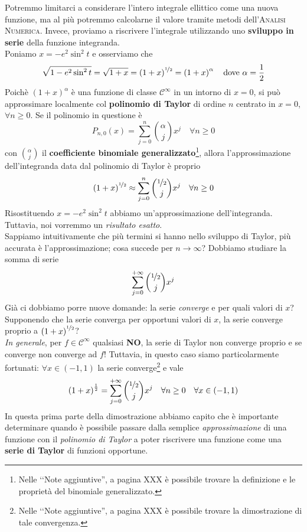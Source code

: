 Potremmo limitarci a considerare l'intero integrale ellittico come una nuova funzione, ma al più potremmo calcolarne il valore tramite metodi dell'\textsc{Analisi Numerica}. Invece, proviamo a riscrivere l'integrale utilizzando uno \textbf{sviluppo in serie} della funzione integranda.\\
Poniamo $x=-e^2\sin^2t$ e osserviamo che
\begin{equation*}
	\sqrt{1-e^2\sin^2 t}=\sqrt{1+x}=\left(1+x\right)^{\nicefrac{1}{2}}=\left(1+x\right)^\alpha\quad\text{dove }\alpha=\frac{1}{2}
\end{equation*}
Poichè $\left(1+x\right)^\alpha$ è una funzione di classe $\mathcal{C}^\infty$ in un intorno di $x=0$, si può approssimare localmente col \textbf{polinomio di Taylor} di ordine $n$ centrato in $x=0$, $\forall n\geq 0$. Se il polinomio in questione è
\begin{equation*}
	P_{n,0}\left(x\right)=\sum_{j=0}^{n}\binom{\alpha}{j}x^j\quad\forall n\geq 0
\end{equation*}
con $\displaystyle\binom{\alpha}{j}$ il \textbf{coefficiente binomiale generalizzato}\footnote{Nelle ‘‘Note aggiuntive'', a pagina XXX è possibile trovare la definizione e le proprietà del binomiale generalizzato.}, allora l'approssimazione dell'integranda data dal polinomio di Taylor è proprio
\begin{equation*}
	\left(1+x\right)^{\nicefrac{1}{2}}\approx\sum_{j=0}^{n}\binom{\nicefrac{1}{2}}{j}x^j\quad\forall n\geq 0
\end{equation*}
Risostituendo $x=-e^2\sin^2t$ abbiamo un'approssimazione dell'integranda. Tuttavia, noi vorremmo un \textit{risultato esatto}.\\
Sappiamo intuitivamente che più termini si hanno nello sviluppo di Taylor, più accurata è l'approssimazione; cosa succede per $n\to\infty$? Dobbiamo studiare la somma di serie
\begin{equation*}
	\sum_{j=0}^{+\infty}\binom{\nicefrac{1}{2}}{j}x^j
\end{equation*}
Già ci dobbiamo porre nuove domande: la serie \textit{converge} e per quali valori di $x$? Supponendo che la serie converga per opportuni valori di $x$, la serie converge proprio a $\left(1+x\right)^{\nicefrac{1}{2}}$?\\
\textit{In generale}, per $f\in\mathcal{C}^\infty$ qualsiasi \textbf{NO}, la serie di Taylor non converge proprio e se converge non converge ad $f$! Tuttavia, in questo caso siamo particolarmente fortunati: $\forall x\in \left(-1, 1\right)$ la serie converge\footnote{Nelle ‘‘Note aggiuntive'', a pagina XXX è possibile trovare la dimostrazione di tale convergenza.} e vale
\begin{equation*}
	\left(1+x\right)^{\frac{1}{2}}=\sum_{j=0}^{+\infty}\binom{\nicefrac{1}{2}}{j}x^j\quad\forall n\geq 0\quad \forall x\in\left(-1, 1\right)
\end{equation*}
In questa prima parte della dimostrazione abbiamo capito che è importante determinare quando è possibile passare dalla semplice \textit{approssimazione} di una funzione con il \textit{polinomio di Taylor} a poter riscrivere una funzione come una \textbf{serie di Taylor} di funzioni opportune.
